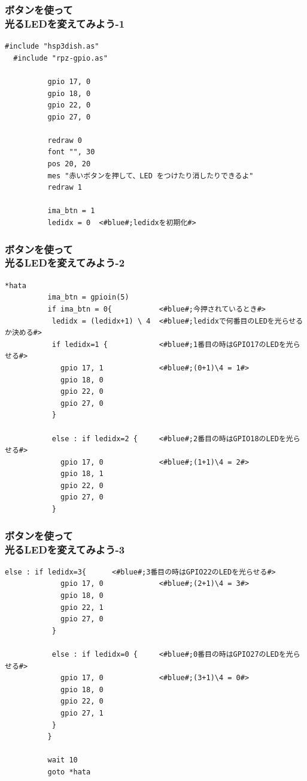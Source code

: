 \documentclass[slide03.tex]{subfiles}
\begin{document}
\begin{frame}[fragile]
  \frametitle{ボタンを使って\\光るLEDを変えてみよう-1}
  \begin{lstlisting}[title=\sim/03/button\_led3.hsp 前半, label=button_led3.hsp-1]
  #include "hsp3dish.as"
  #include "rpz-gpio.as"

          gpio 17, 0
          gpio 18, 0
          gpio 22, 0
          gpio 27, 0

          redraw 0
          font "", 30
          pos 20, 20
          mes "赤いボタンを押して、LED をつけたり消したりできるよ"
          redraw 1

          ima_btn = 1
          ledidx = 0  <#blue#;ledidxを初期化#>
  \end{lstlisting}
\end{frame}

\begin{frame}[fragile]
  \frametitle{ボタンを使って\\光るLEDを変えてみよう-2}
  \begin{lstlisting}[title=\sim/03/button\_led3.hsp 中盤, label=button_led3.hsp-2]
  *hata
          ima_btn = gpioin(5)
          if ima_btn = 0{           <#blue#;今押されているとき#>
           ledidx = (ledidx+1) \ 4  <#blue#;ledidxで何番目のLEDを光らせるか決める#>
           if ledidx=1 {            <#blue#;1番目の時はGPIO17のLEDを光らせる#>
             gpio 17, 1             <#blue#;(0+1)\4 = 1#>
             gpio 18, 0
             gpio 22, 0
             gpio 27, 0
           }

           else : if ledidx=2 {     <#blue#;2番目の時はGPIO18のLEDを光らせる#>
             gpio 17, 0             <#blue#;(1+1)\4 = 2#>
             gpio 18, 1
             gpio 22, 0
             gpio 27, 0
           }
  \end{lstlisting}
\end{frame}

\begin{frame}[fragile]
  \frametitle{ボタンを使って\\光るLEDを変えてみよう-3}
  \begin{lstlisting}[title=button\_led3.hsp 後半, label=button_led3.hsp-3]
           else : if ledidx=3{      <#blue#;3番目の時はGPIO22のLEDを光らせる#>
             gpio 17, 0             <#blue#;(2+1)\4 = 3#>
             gpio 18, 0
             gpio 22, 1
             gpio 27, 0
           }

           else : if ledidx=0 {     <#blue#;0番目の時はGPIO27のLEDを光らせる#>
             gpio 17, 0             <#blue#;(3+1)\4 = 0#>
             gpio 18, 0
             gpio 22, 0
             gpio 27, 1
           }
          }

          wait 10
          goto *hata
  \end{lstlisting}
\end{frame}
\end{document}
